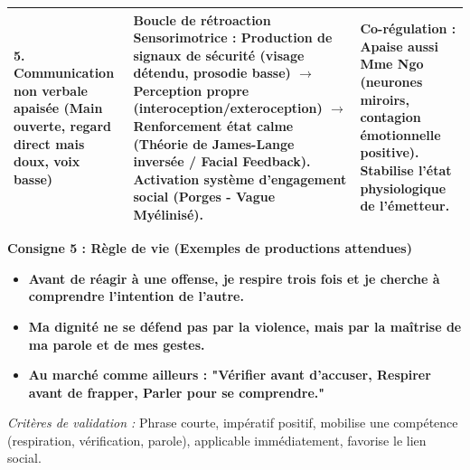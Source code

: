 \documentclass[11pt]{article}
\begin{document}
\begin{exoresolu}
\begin{center}
\begin{tabularx}{\linewidth}{|l|X|X|}
\textbf{5. Communication non verbale apaisée (Main ouverte, regard direct mais doux, voix basse)} & Boucle de rétroaction \textbf{Sensorimotrice} : Production de signaux de sécurité (visage détendu, prosodie basse) $\rightarrow$ Perception propre (interoception/exteroception) $\rightarrow$ Renforcement état calme (Théorie de James-Lange inversée / Facial Feedback). Activation système \textbf{d'engagement social} (Porges - Vague Myélinisé). & \textbf{Co-régulation} : Apaise aussi Mme Ngo (neurones miroirs, contagion émotionnelle positive). Stabilise l'état physiologique de l'émetteur. \\ \hline
\end{tabularx}
\end{center}

\textbf{Consigne 5 : Règle de vie (Exemples de productions attendues)}
\begin{itemize}
    \item \og \textbf{Avant de réagir à une offense, je respire trois fois et je cherche à comprendre l'intention de l'autre.} \fg
    \item \og \textbf{Ma dignité ne se défend pas par la violence, mais par la maîtrise de ma parole et de mes gestes.} \fg
    \item \og \textbf{Au marché comme ailleurs : "Vérifier avant d'accuser, Respirer avant de frapper, Parler pour se comprendre."} \fg
\end{itemize}
\emph{Critères de validation :} Phrase courte, impératif positif, mobilise une compétence (respiration, vérification, parole), applicable immédiatement, favorise le lien social.

\end{exoresolu}
\end{document}
